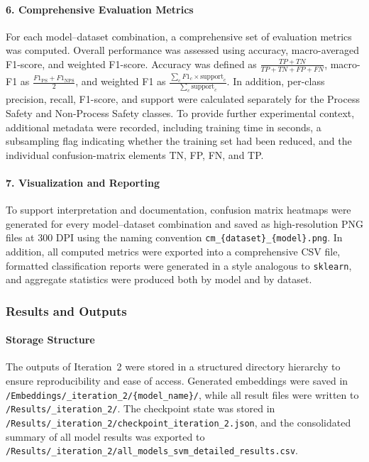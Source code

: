 \documentclass[11pt, titlepage, bibliography=totoc]{scrreprt}
\begin{document}
\paragraph{6. Comprehensive Evaluation Metrics}
For each model--dataset combination, a comprehensive set of evaluation metrics was computed. Overall performance was assessed using accuracy, macro-averaged F1-score, and weighted F1-score. Accuracy was defined as \(\frac{TP + TN}{TP + TN + FP + FN}\), macro-F1 as \(\frac{F1_{\text{PS}} + F1_{\text{NPS}}}{2}\), and weighted F1 as \(\frac{\sum_{c} F1_c \times \text{support}_c}{\sum_{c} \text{support}_c}\). In addition, per-class precision, recall, F1-score, and support were calculated separately for the Process Safety and Non-Process Safety classes. To provide further experimental context, additional metadata were recorded, including training time in seconds, a subsampling flag indicating whether the training set had been reduced, and the individual confusion-matrix elements TN, FP, FN, and TP.

\paragraph{7. Visualization and Reporting}
To support interpretation and documentation, confusion matrix heatmaps were generated for every model--dataset combination and saved as high-resolution PNG files at 300 DPI using the naming convention \texttt{cm\_\{dataset\}\_\{model\}.png}. In addition, all computed metrics were exported into a comprehensive CSV file, formatted classification reports were generated in a style analogous to \texttt{sklearn}, and aggregate statistics were produced both by model and by dataset.

\subsubsection{Results and Outputs}

\paragraph{Storage Structure}
The outputs of Iteration~2 were stored in a structured directory hierarchy to ensure reproducibility and ease of access. Generated embeddings were saved in \texttt{/Embeddings/\_iteration\_2/\{model\_name\}/}, while all result files were written to \texttt{/Results/\_iteration\_2/}. The checkpoint state was stored in \texttt{/Results/\_iteration\_2/checkpoint\_iteration\_2.json}, and the consolidated summary of all model results was exported to \texttt{/Results/\_iteration\_2/all\_models\_svm\_detailed\_results.csv}.
\end{document}
